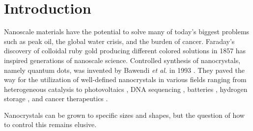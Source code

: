 
\section{Introduction}


Nanoscale materials have the potential to solve many of today's biggest problems such as peak oil, the global water crisis, and the burden of cancer.
Faraday's discovery of colloidal ruby gold producing different colored solutions in 1857 \cite{Faraday_1857,Thompson_2007} has inspired generations of nanoscale science.
Controlled synthesis of nanocrystals, namely quantum dots, was invented by Bawendi \textit{et al.} in 1993 \cite{hakimi1993quantum,Murray_2000}.
They paved the way for the utilization of well-defined nanocrystals in various fields ranging from heterogeneous catalysis \cite{astruc2008nanoparticles,Astruc_2006} to photovoltaics \cite{Atwater_2010}, DNA sequencing \cite{McNally_2010}, batteries \cite{Panniello_2014}, hydrogen storage \cite{Jena_2011,Ramos_Castillo_2015}, and cancer therapeutics \cite{Jain_2010,Kim_2010}.

%

Nanocrystals can be grown to specific sizes and shapes, but the question of how to control this remains elusive.

  
  
  
  
  
  